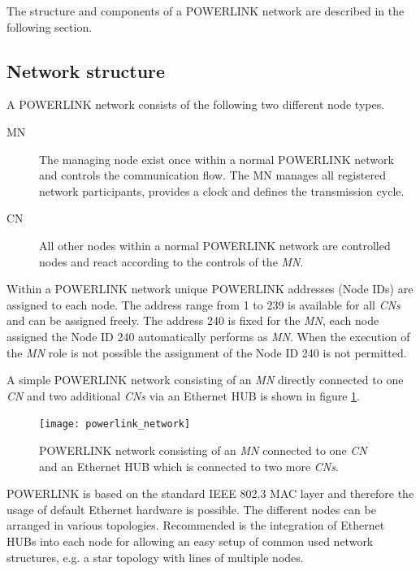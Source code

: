 The structure and components of a POWERLINK network are described in the following section.

\subsection{Network structure}
\label{sec:oplk_powerlink_network}
A POWERLINK network consists of the following two different node types.

\begin{description}
    \item[MN] The managing node exist once within a normal POWERLINK network and controls the communication flow.
    The MN manages all registered network participants, provides a clock and defines the transmission cycle.
    \item[CN] All other nodes within a normal POWERLINK network are controlled nodes and react according to the controls of the \emph{MN}.
\end{description}

Within a POWERLINK network unique POWERLINK addresses (Node IDs) are assigned to each node.
The address range from 1 to 239 is available for all \emph{CNs} and can be assigned freely.
The address 240 is fixed for the \emph{MN}, each node assigned the Node ID 240 automatically performs as \emph{MN}.
When the execution of the \emph{MN} role is not possible the assignment of the Node ID 240 is not permitted.
\cite{epsg_epsg_2013}

A simple POWERLINK network consisting of an \emph{MN} directly connected to one \emph{CN} and two additional \emph{CNs} via an Ethernet HUB is shown in figure \ref{fig:powerlink_network}.

\begin{figure}
    \centering
    \texttt{[image: powerlink\_network]}
    \caption{POWERLINK network consisting of an \emph{MN} connected to one \emph{CN} and an Ethernet HUB which is connected to two more \emph{CNs}.}
    \label{fig:powerlink_network}
\end{figure}

POWERLINK is based on the standard IEEE 802.3 MAC layer and therefore the usage of default Ethernet hardware is possible.
The different nodes can be arranged in various topologies.
Recommended is the integration of Ethernet HUBs into each node for allowing an easy setup of common used network structures, e.g. a star topology with lines of multiple nodes. \cite[chapter 3]{epsg_epsg_2013} %

